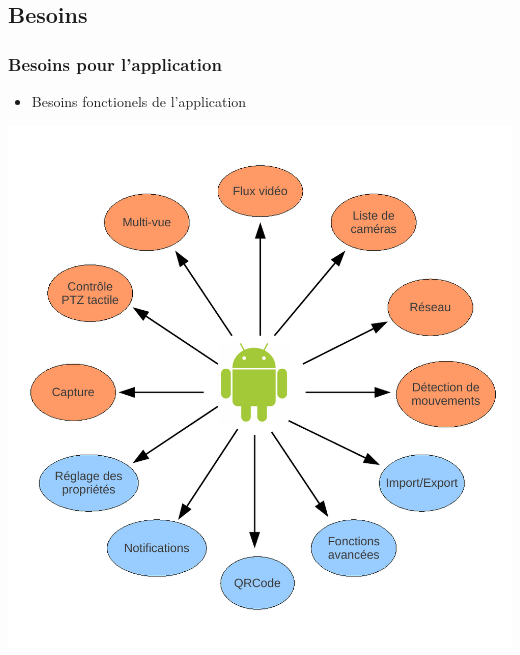 
\subsection{Besoins}
  \begin{frame}
   \frametitle{Besoins pour l'application}

  \centering
  \begin{minipage}{0.95\textwidth}
	\begin{itemize}
    \item Besoins fonctionels de l'application
    \end{itemize}
    \end{minipage}
   
     \includegraphics[scale=0.4]{Images/besoinsF.pdf}
   
  \end{frame}